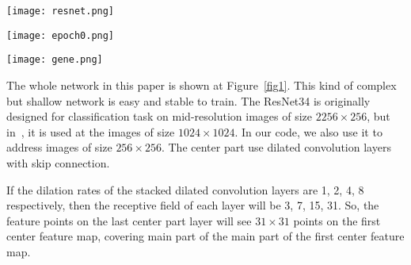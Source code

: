 \documentclass[a4paper]{article}
\begin{document}
\begin{figure*}
\begin{center}
\texttt{[image: resnet.png]}
\end{center}
\caption{D-LinkNet architecture. Each blue rectangular block represents a multi-channel features map. Part A is the encoder of D-LinkNet. D-LinkNet uses ResNet34 as encoder. Part C is the decoder of D-LinkNet, it is set the same as LinkNet decoder. Original LinkNet only has Part A and Part C. D-LinkNet has an additional Part B which can enlarge the receptive field and as well as preserve the detailed spatial information. Each convolution layer is followed by a ReLU activation except the last convolution layer which use sigmoid activation.}
\label{fig1}
\end{figure*}

\begin{figure*}
\begin{center}
\texttt{[image: epoch0.png]}
\end{center}
\caption{{\bf Left:} The real image. {\bf Center:} The generated fake image using dilated convolution network. {\bf Right:} The generated fake image using basic model.}
\label{fig2}
\end{figure*}

\begin{figure*}
\begin{center}
\texttt{[image: gene.png]}
\end{center}
\caption{{\bf Left:} The real image. {\bf Center:} The generated fake image using dilated convolution network. {\bf Right:} The generated fake image using basic model.}
\label{fig3}
\end{figure*}

The whole network in this paper is shown at Figure~\ref{fig1}. This kind of complex but shallow network is easy and stable to train. The ResNet34 is originally designed for classification task on mid-resolution images of size $2256\times 256$, but in~\cite{D}, it is used at the images of size $1024\times 1024$. In our code, we also use it to address images of size $256\times 256$. The center part use dilated convolution layers with skip connection. 

If the dilation rates of the stacked dilated convolution layers are 1, 2, 4, 8 respectively, then the receptive field of each layer will be 3, 7, 15, 31. So, the feature points on the last center part layer will see $31\times 31$ points on the first center feature map, covering main part of the main part of the first center feature map. 
\end{document}
